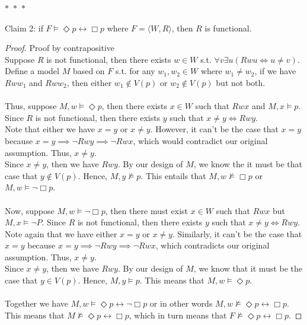 \documentclass[12pt]{article}
\newcommand{\B}{\Box}
\newcommand{\D}{\Diamond}
\newcommand{\s}{\vDash}
\newcommand{\ns}{\nvDash}
\begin{document}
\noindent
\begin{center}
    $\ast$~$\ast$~$\ast$
\end{center}
Claim 2: if $F \vDash \D p \leftrightarrow \B p$ where $F = \langle W, R \rangle$, then $R$ is functional. 
\begin{proof} Proof by contrapositive\\
    Suppose $R$ is not functional, then there exists $w \in W$ s.t. $\forall v \exists u (Rwu \iff u \neq v)$.
    Define a model $M$ based on $F$ s.t. for any $w_1, w_2 \in W$ where $w_1 \neq w_2$, if we have $Rww_1$ and $Rww_2$, then either $w_1 \notin V(p)$ or $w_2 \notin V(p)$ but not both.\\
    \\
    Thus, suppose $M, w \s \D p$, then there exists $x \in W$ such that $Rwx$ and $M, x \s p$.
    Since $R$ is not functional, then there exists $y$ such that $x \neq y \iff Rwy$.\\
    Note that either we have $x = y$ or $x \neq y$. 
    However, it can't be the case that $x = y$ because $x = y \implies \neg Rwy \implies \neg Rwx$, which would contradict our original assumption.
    Thus, $x \neq y$.\\
    Since $x \neq y$, then we have $Rwy$.
    By our design of $M$, we know the it must be that case that $y \notin V(p)$.
    Hence, $M, y \ns p$. This entails that $M, w \ns \B p$ or $M, w \s \neg \B p$.\\
    \\
    Now, suppose $M, w \s \neg \B p$, then there must exist $x \in W$ such that $Rwx$ but $M,x \s \neg P$.
    Since $R$ is not functional, then there exists $y$ such that $x \neq y \iff Rwy$.\\
    Note again that we have either $x = y$ or $x \neq y$. 
    Similarly, it can't be the case that $x = y$ because $x = y \implies \neg Rwy \implies \neg Rwx$, which contradicts our original assumption.
    Thus, $x \neq y$.\\
    Since $x \neq y$, then we have $Rwy$. By our design of $M$, we know that it must be the case that $y \in V(p)$.
    Hence, $M, y \s p$. This means that $M, w \s \D p$.\\
    \\
    Together we have $M, w \s \D p \leftrightarrow \neg \B p$ or in other words $M, w \ns \D p \leftrightarrow \B p$. 
    This means that $M \ns \D p \leftrightarrow \B p$, which in turn means that $F \ns \D p \leftrightarrow \B p$.



\end{proof}
\end{document}
